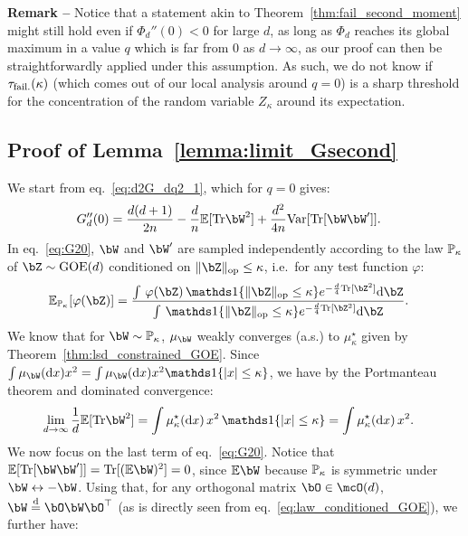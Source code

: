\myskip 
\textbf{Remark --} Notice that a statement akin to Theorem~\ref{thm:fail_second_moment} might still hold even if $\Phi_d''(0) < 0$ for large $d$, as long 
as $\Phi_d$ reaches its global maximum in a value $q$ which is far from $0$ as $d \to \infty$, as our proof can then be straightforwardly applied under this assumption.
As such, we do not know if $\tau_{\rm fail.}(\kappa)$ (which 
comes out of our local analysis around $q = 0$) is a sharp threshold for the concentration of the random variable $Z_\kappa$ around its expectation.

\subsection{Proof of Lemma~\ref{lemma:limit_Gsecond}}\label{subsec:proof_limit_Gsecond}

We start from eq.~\eqref{eq:d2G_dq2_1}, which for $q = 0$ gives:
\begin{align}\label{eq:G20}
    G_d''(0) &= \frac{d(d+1)}{2n} - \frac{d}{n} \EE[\Tr \bW^2] + \frac{d^2}{4n} \textrm{Var}[\Tr[\bW \bW']].
\end{align}
In eq.~\eqref{eq:G20}, $\bW$ and $\bW'$ are sampled independently according to the law 
$\mathbb{P}_\kappa$ of $\bZ \sim \GOE(d)$ conditioned on $\|\bZ\|_\op \leq \kappa$, i.e.\
for any test function $\varphi$:
\begin{align}\label{eq:law_conditioned_GOE}
    \EE_{\bbP_\kappa}[\varphi(\bZ)] &= \frac{\int \, \varphi(\bZ) \, \indi\{\|\bZ\|_\op \leq \kappa\} e^{-\frac{d}{4} \Tr[\bZ^2]} \rd \bZ}{\int \, \indi\{\|\bZ\|_\op \leq \kappa\} e^{-\frac{d}{4} \Tr[\bZ^2]} \rd \bZ}.
\end{align}
We know that for $\bW \sim \bbP_\kappa$, $\mu_\bW$ weakly converges (a.s.) to $\mu_\kappa^\star$ given by Theorem~\ref{thm:lsd_constrained_GOE}.
Since $\int \mu_\bW(\rd x) x^2 = \int \mu_\bW(\rd x) x^2 \indi\{|x| \leq \kappa\}$, we have by the Portmanteau theorem 
and dominated convergence: 
\begin{align}\label{eq:term_1_G20}
    \lim_{d \to \infty} \frac{1}{d}\EE[\Tr \bW^2] &= \int \mu_\kappa^\star(\rd x) \, x^2 \, \indi\{|x| \leq \kappa\} = \int \mu_\kappa^\star(\rd x) \, x^2.
\end{align}
We now focus on the last term of eq.~\eqref{eq:G20}.
Notice that $\EE[\Tr[\bW \bW']] = \Tr[(\EE \bW)^2] = 0$, since $\EE \bW$ because $\mathbb{P}_\kappa$ is symmetric under $\bW \leftrightarrow - \bW$.
Using that, for any orthogonal matrix $\bO \in \mcO(d)$, $\bW \deq \bO \bW \bO^\T$ (as is directly seen from eq.~\eqref{eq:law_conditioned_GOE}), we further have:
